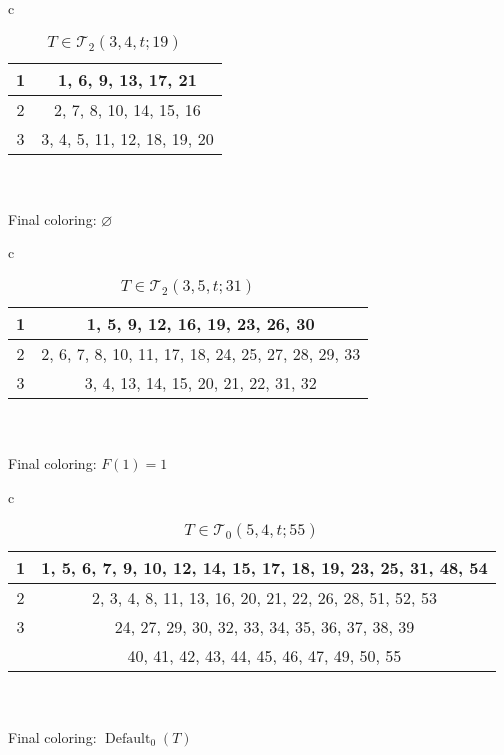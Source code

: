 \documentclass{article}
\DeclareMathOperator{\coldef}{Default}
\begin{document}
\begin{table}[H]
\caption{\(T \in \mathcal{T}_2(3, 4, t; 19)\)}
\begin{center}
\begin{tabular}{c}
	\begin{tabular}{| c | c |}
		\hline
		1 & 1, 6, 9, 13, 17, 21 \\
		\hline
		2 & 2, 7, 8, 10, 14, 15, 16 \\
		\hline
		3 & 3, 4, 5, 11, 12, 18, 19, 20 \\
		\hline
	\end{tabular} \\ \\
	 Final coloring: \(\varnothing\)
\end{tabular}
\end{center}
\end{table}

\begin{table}[H]
\caption{\(T \in \mathcal{T}_2(3, 5, t; 31)\)}
\begin{center}
\begin{tabular}{c}
	\begin{tabular}{| c | c |}
		\hline
		1 & 1, 5, 9, 12, 16, 19, 23, 26, 30 \\
		\hline
		2 & 2, 6, 7, 8, 10, 11, 17, 18, 24, 25, 27, 28, 29, 33 \\
		\hline
		3 & 3, 4, 13, 14, 15, 20, 21, 22, 31, 32 \\
		\hline
	\end{tabular} \\ \\
	 Final coloring: \(F(1) = 1\)
\end{tabular}
\end{center}
\end{table}

\begin{table}[H]
\caption{\(T \in \mathcal{T}_0(5, 4, t; 55)\)}
\begin{center}
\begin{tabular}{c}
	\begin{tabular}{| c | c |}
		\hline
		1 & 1, 5, 6, 7, 9, 10, 12, 14, 15, 17, 18, 19, 23, 25, 31, 48, 54 \\
		\hline
		2 & 2, 3, 4, 8, 11, 13, 16, 20, 21, 22, 26, 28, 51, 52, 53 \\
		\hline
		3 & 24, 27, 29, 30, 32, 33, 34, 35, 36, 37, 38, 39 \\
		 & 40, 41, 42, 43, 44, 45, 46, 47, 49, 50, 55 \\
		\hline
	\end{tabular} \\ \\
	 Final coloring: \(\coldef_0(T)\)
\end{tabular}
\end{center}
\end{table}
\end{document}
